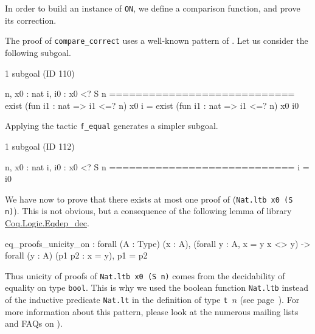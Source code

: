  




In order to build an instance of \texttt{ON}, we define a comparison function,  and prove its correction.





\begin{remark}
 The proof of \texttt{compare\_correct} uses a well-known pattern of \coq{}.
Let us consider  the following subgoal.

\begin{Coqanswer}
 1 subgoal (ID 110)
  
  n, x0 : nat
  i, i0 : x0 <? S n
  ============================
  exist (fun i1 : nat => i1 <=? n) x0 i =
  exist (fun i1 : nat => i1 <=? n) x0 i0
\end{Coqanswer}

Applying the tactic \texttt{f\_equal} generates a simpler subgoal.

\begin{Coqanswer}
1 subgoal (ID 112)
  
  n, x0 : nat
  i, i0 : x0 <? S n
  ============================
  i = i0
\end{Coqanswer}

We have now to prove that there exists at most one  proof of (\texttt{Nat.ltb x0 (S n)}). This is not obvious, but  a consequence of the following lemma of library 
\href{https://coq.inria.fr/distrib/current/stdlib/Coq.Logic.Eqdep_dec.html}{Coq.Logic.Eqdep\_dec}.

\label{sect:eq-proof-unicity}

\begin{Coqanswer}
eq_proofs_unicity_on :
forall (A : Type) (x : A),
(forall y : A, x = y \/ x <> y) -> 
forall (y : A) (p1 p2 : x = y), p1 = p2
\end{Coqanswer}

Thus unicity of proofs of \texttt{Nat.ltb x0 (S n)}  comes from the decidability of
equality on type \texttt{bool}.
This is why we used the boolean function \texttt{Nat.ltb} instead of the inductive predicate \texttt{Nat.lt} in the definition of type \texttt{t $n$} (see page~\pageref{def: Finite-ord-type}).
For more information about this pattern, please look at the numerous mailing lists and 
FAQs on \coq{}).



\end{remark}


